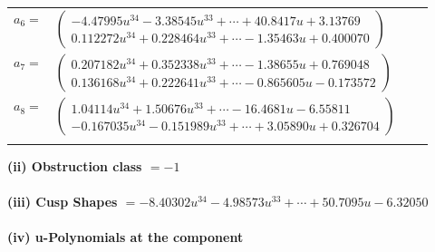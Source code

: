 \documentclass[1p]{elsarticle_modified}
\theoremstyle{definition}
\begin{document}
\begin{tabular}{m{7pt} m{180pt} m{7pt} m{180pt} }
\flushright $a_{6}=$&$\begin{pmatrix}-4.47995 u^{34}-3.38545 u^{33}+\cdots+40.8417 u+3.13769\\0.112272 u^{34}+0.228464 u^{33}+\cdots-1.35463 u+0.400070\end{pmatrix}$ \\
\flushright $a_{7}=$&$\begin{pmatrix}0.207182 u^{34}+0.352338 u^{33}+\cdots-1.38655 u+0.769048\\0.136168 u^{34}+0.222641 u^{33}+\cdots-0.865605 u-0.173572\end{pmatrix}$ \\
\flushright $a_{8}=$&$\begin{pmatrix}1.04114 u^{34}+1.50676 u^{33}+\cdots-16.4681 u-6.55811\\-0.167035 u^{34}-0.151989 u^{33}+\cdots+3.05890 u+0.326704\end{pmatrix}$\\&\end{tabular}
\flushleft \textbf{(ii) Obstruction class $= -1$}\\~\\
\flushleft \textbf{(iii) Cusp Shapes $= -8.40302 u^{34}-4.98573 u^{33}+\cdots+50.7095 u-6.32050$}\\~\\
\newpage\renewcommand{\arraystretch}{1}
\flushleft \textbf{(iv) u-Polynomials at the component}\newline \\
\end{document}
